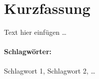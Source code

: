 \documentclass[../bachelor_paper.tex]{subfiles}
\begin{document}
\section*{Kurzfassung}\thispagestyle{empty}
    \label{chap:kurzfassung}

    Text hier einfügen \dots
    
    \vfill
\paragraph*{Schlagwörter:} Schlagwort 1, Schlagwort 2, \dots
{}

\isstandalone



\fi
\end{document}
